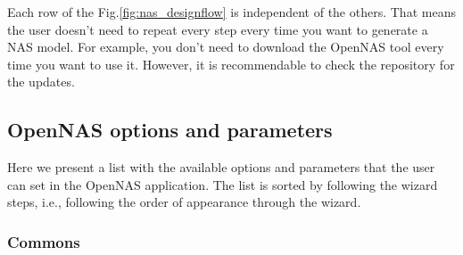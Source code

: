 Each row of the Fig.\ref{fig:nas_designflow} is independent of the others. That means the user doesn't need to repeat every step every time you want to generate a NAS model. For example, you don't need to download the OpenNAS tool every time you want to use it. However, it is recommendable to check the repository for the updates.


\subsection{OpenNAS options and parameters}




Here we present a list with the available options and parameters that the user can set in the OpenNAS application. The list is sorted by following the wizard steps, i.e., following the order of appearance through the wizard.

\subsubsection{Commons}

